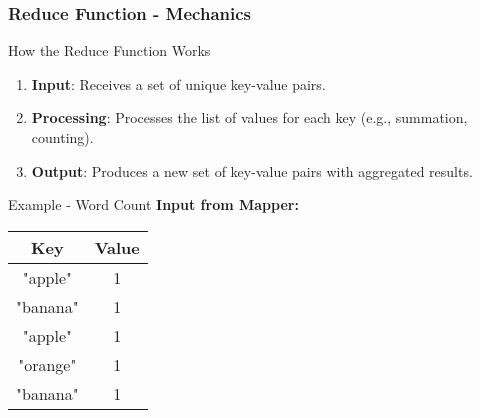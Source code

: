 \documentclass[aspectratio=169]{beamer}
\begin{document}
\begin{frame}[fragile]
    \frametitle{Reduce Function - Mechanics}
    \begin{block}{How the Reduce Function Works}
        \begin{enumerate}
            \item \textbf{Input}: Receives a set of unique key-value pairs.
            \item \textbf{Processing}: Processes the list of values for each key (e.g., summation, counting).
            \item \textbf{Output}: Produces a new set of key-value pairs with aggregated results.
        \end{enumerate}
    \end{block}
    
    \begin{block}{Example - Word Count}
        \textbf{Input from Mapper:}
        \begin{tabular}{|c|c|}
            \hline
            Key & Value \\
            \hline
            "apple" & 1 \\
            "banana" & 1 \\
            "apple" & 1 \\
            "orange" & 1 \\
            "banana" & 1 \\
            \hline
        \end{tabular}
    \end{block}
\end{frame}
\end{document}
